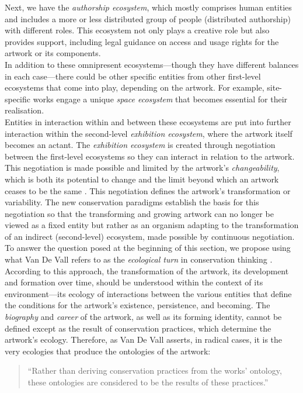 Next, we have the \textit{authorship ecosystem}, which mostly comprises human entities and includes a more or less distributed group of people (distributed authorship) with different roles. This ecosystem not only plays a creative role but also provides support, including legal guidance on access and usage rights for the artwork or its components.\\
In addition to these omnipresent ecosystems—though they have different balances in each case—there could be other specific entities from other first-level ecosystems that come into play, depending on the artwork. For example, site-specific works engage a unique \textit{space ecosystem} that becomes essential for their realisation.\\
Entities in interaction within and between these ecosystems are put into further interaction within the second-level \textit{exhibition ecosystem}, where the artwork itself becomes an actant. The \textit{exhibition ecosystem} is created through negotiation between the first-level ecosystems so they can interact in relation to the artwork. This negotiation is made possible and limited by the artwork’s \textit{changeability}, which is both its potential to change \cite{holling2017paik} and the limit beyond which an artwork ceases to be the same \cite{van2023theories}. This negotiation defines the artwork’s transformation or variability. The new conservation paradigms establish the basis for this negotiation so that the transforming and growing artwork can no longer be viewed as a fixed entity but rather as an organism adapting to the transformation of an indirect (second-level) ecosystem, made possible by continuous negotiation.\\
To answer the question posed at the beginning of this section, we propose using what Van De Vall refers to as the \textit{ecological turn} in conservation thinking \cite{van2023theories}. According to this approach, the transformation of the artwork, its development and formation over time, should be understood within the context of its environment—its ecology of interactions between the various entities that define the conditions for the artwork’s existence, persistence, and becoming. The \textit{biography} and \textit{career} of the artwork, as well as its forming identity, cannot be defined except as the result of conservation practices, which determine the artwork’s ecology. Therefore, as Van De Vall asserts, in radical cases, it is the very ecologies that produce the ontologies of the artwork:
\begin{quote}
“Rather than deriving conservation practices from the works’ ontology, these ontologies are considered to be the results of these practices.” \cite{van2023theories}    
\end{quote}

